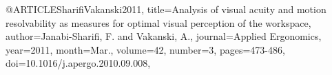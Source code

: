 @ARTICLE{SharifiVakanski2011,
title={Analysis of visual acuity and motion resolvability as measures for optimal visual perception of the workspace},
author={Janabi-Sharifi, F. and Vakanski, A.},
journal={Applied Ergonomics},
year={2011},
month={Mar.},
volume={42},
number={3},
pages={473-486},
doi={10.1016/j.apergo.2010.09.008},}